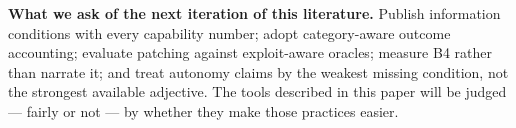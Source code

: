 \textbf{What we ask of the next iteration of this literature.} Publish information conditions
with every capability number; adopt category-aware outcome accounting; evaluate patching
against exploit-aware oracles; measure B4 rather than narrate it; and treat autonomy claims by
the weakest missing condition, not the strongest available adjective. The tools described in
this paper will be judged --- fairly or not --- by whether they make those practices easier.
